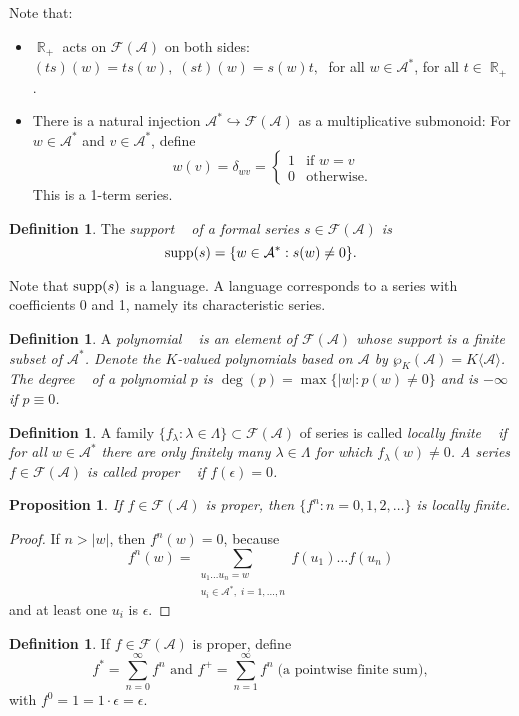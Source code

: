 \documentclass{kepart2010}
\theoremstyle{plain}
\newtheorem{prop}[thm]{Proposition}
\theoremstyle{definition}
\newtheorem{defn}[thm]{Definition}
\theoremstyle{remark}
\theoremstyle{definition}
\numberwithin{equation}{section}
\begin{document}
Note that:
\begin{itemize}
\item $\operatorname{\mathbb R}_{+}$ acts on ${\mathcal F ({{\mathcal A}})}$ on both sides: \\
      $(ts)(w) = ts(w), \; (st)(w) = s(w)t, \; $ for all
      $w \in {{\mathcal A}}^{*}$, for all $t \in \operatorname{\mathbb R}_{+}$.
\item There is a natural injection ${{\mathcal A}}^{*} \hookrightarrow {\mathcal F ({{\mathcal A}})}$ as a
multiplicative submonoid: For $w\in {{\mathcal A}}^{*}$ and $v \in {{\mathcal A}}^{*}$,
define
    $$w(v)= \delta_{wv} = \begin{cases}      1 & \text{if $w=v$} \\
   0 & \text{otherwise.}       \end{cases}$$
This is a 1-term series.
\end{itemize}
\begin{defn}
The \em{support} \em~ of a formal series $s \in {\mathcal F ({{\mathcal A}})}$ is
$$\operatorname{\text supp}(s) = \{ w \in {{\mathcal A}}^{*}: s(w)\neq 0\} .$$
\end{defn}
Note that $\operatorname{\text supp}(s)$ is a language. A language corresponds to a
series with coefficients 0 and 1, namely its characteristic series.
\begin{defn}\label{defn_poly}
A \em polynomial \em~ is an element of ${\mathcal F ({{\mathcal A}})}$ whose support is a
finite subset of ${{\mathcal A}}^{*}$. Denote the $K$-valued polynomials based
on ${{\mathcal A}}$ by $\wp_{K}({{\mathcal A}})=K \langle {{\mathcal A}} \rangle$. The \em degree
\em~ of a polynomial $p$ is $\deg(p) = \max \{|w|:p(w) \neq 0\}$ and
is $- \infty$ if $p \equiv 0$.
\end{defn}
\begin{defn}  A family $\{f_{\lambda}: \lambda \in \Lambda\} \subset {\mathcal F ({{\mathcal A}})}$ of series
is called \em locally finite \em~ if for all $w \in {{\mathcal A}}^{*}$ there
are only finitely many $\lambda \in \Lambda$ for which
$f_{\lambda}(w)\neq 0$. A series $f \in {\mathcal F ({{\mathcal A}})}$ is called \em proper
\em~ if $f(\epsilon)=0$.
\end{defn}
\begin{prop}
If $f \in {\mathcal F ({{\mathcal A}})}$ is proper, then $\{f^{n}: n=0, 1, 2, \dots \}$ is
locally finite.
\end{prop}
\begin{proof}  If $n>|w|$, then $f^{n}(w) = 0$, because \\
$$f^{n}(w) = \displaystyle \sum_{\substack{
u_{1} \dots u_{n} = w\\
 u_i \in {{\mathcal A}}^{*}, \; i=1, \dots , n}
 }f(u_{1}) \dots f(u_{n}
)$$ and at least one $u_{i}$ is $\epsilon$.
\end{proof}
\begin{defn}
If $f \in {\mathcal F ({{\mathcal A}})}$ is proper, define $$f^{*} = \sum_{n=0}^\infty f^{n}
\textrm{ and } f^{+} = \sum_{n=1}^\infty f^{n} \; \textrm{(a
pointwise finite sum)},$$ with $f^0 = 1 = 1 \cdot \epsilon =
\epsilon$.
\end{defn}
\end{document}
